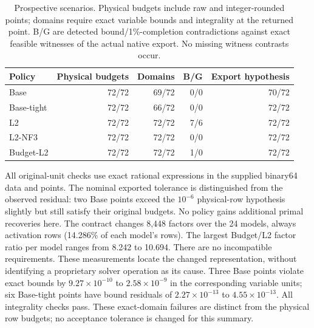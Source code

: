 \begin{table}[htbp]
\centering\small
\caption{Prospective scenarios. Physical budgets include raw and integer-rounded
points; domains require exact variable bounds and integrality at the returned
point. B/G are detected bound/1\%-completion contradictions against exact feasible
witnesses of the actual native export. No missing witness contrasts occur.}
\label{tab:orf-prospective-accuracy}
\begin{tabular}{lrrrr}\toprule
Policy & Physical budgets & Domains & B/G & Export hypothesis\\\midrule
Base & 72/72 & 69/72 & 0/0 & 70/72\\
Base-tight & 72/72 & 66/72 & 0/0 & 72/72\\
L2 & 72/72 & 72/72 & 7/6 & 72/72\\
L2-NF3 & 72/72 & 72/72 & 0/0 & 72/72\\
Budget-L2 & 72/72 & 72/72 & 1/0 & 72/72\\
\bottomrule\end{tabular}\end{table}
All original-unit checks use exact rational expressions in the supplied
binary64 data and points. The nominal exported tolerance is distinguished from
the observed residual: two Base points exceed the $10^{-6}$ physical-row
hypothesis slightly but still satisfy their original budgets. No policy gains
additional primal recoveries here. The contract changes 8,448 factors over the
24 models, always activation rows (14.286\% of each model's rows). The largest
Budget/L2 factor ratio per model ranges from 8.242 to 10.694. There are no
incompatible requirements. These measurements locate the changed representation,
without identifying a proprietary solver operation as its cause.
Three Base points violate exact bounds by $9.27\times10^{-10}$ to
$2.58\times10^{-9}$ in the corresponding variable units; six Base-tight points
have bound residuals of $2.27\times10^{-13}$ to $4.55\times10^{-13}$.
All integrality checks pass. These exact-domain failures are distinct from
the physical row budgets; no acceptance tolerance is changed for this summary.

